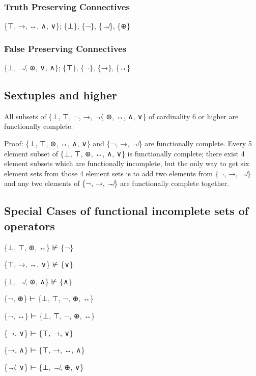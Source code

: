 \hypertarget{truth-preserving-connectives-2}{%
\subsubsection{Truth Preserving
Connectives}\label{truth-preserving-connectives-2}}

\{⊤, →, ↔, ∧, ∨\}; \{⊥\}, \{¬\}, \{↛\}, \{⊕\}

\hypertarget{false-preserving-connectives-2}{%
\subsubsection{False Preserving
Connectives}\label{false-preserving-connectives-2}}

\{⊥, ↛, ⊕, ∨, ∧\}; \{⊤\}, \{¬\}, \{→\}, \{↔\}

\hypertarget{sextuples-and-higher}{%
\subsection{Sextuples and higher}\label{sextuples-and-higher}}

All subsets of \{⊥, ⊤, ¬, →, ↛, ⊕, ↔, ∧, ∨\} of cardinality 6 or higher
are functionally complete.

Proof: \{⊥, ⊤, ⊕, ↔, ∧, ∨\} and \{¬, →, ↛\} are functionally complete.
Every 5 element subset of \{⊥, ⊤, ⊕, ↔, ∧, ∨\} is functionally complete;
there exist 4 element subsets which are functionally incomplete, but the
only way to get six element sets from those 4 element sets is to add two
elements from \{¬, →, ↛\} and any two elements of \{¬, →, ↛\} are
functionally complete together.

\hypertarget{special-cases-of-functional-incomplete-sets-of-operators}{%
\subsection{Special Cases of functional incomplete sets of
operators}\label{special-cases-of-functional-incomplete-sets-of-operators}}

\{⊥, ⊤, ⊕, ↔\} ⊬ \{¬\}

\{⊤, →, ↔, ∨\} ⊬ \{∨\}

\{⊥, ↛, ⊕, ∧\} ⊬ \{∧\}

\{¬, ⊕\} ⊢ \{⊥, ⊤, ¬, ⊕, ↔\}

\{¬, ↔\} ⊢ \{⊥, ⊤, ¬, ⊕, ↔\}

\{→, ∨\} ⊢ \{⊤, →, ∨\}

\{→, ∧\} ⊢ \{⊤, →, ↔, ∧\}

\{↛, ∨\} ⊢ \{⊥, ↛, ⊕, ∨\}

